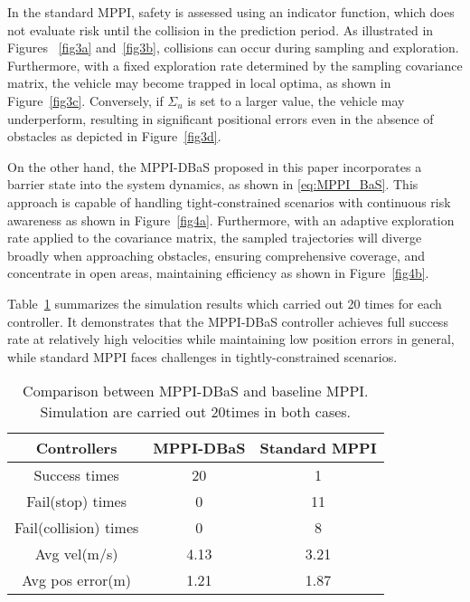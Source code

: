 \documentclass[english]{cccconf}
\begin{document}
In the standard MPPI, safety is assessed using an indicator function, which does not evaluate risk until the collision in the prediction period. As illustrated in Figures ~\ref{fig3a} and~\ref{fig3b}, collisions can occur during sampling and exploration. Furthermore, with a fixed exploration rate determined by the sampling covariance matrix, the vehicle may become trapped in local optima, as shown in Figure~\ref{fig3c}. Conversely, if $\Sigma_u$ is set to a larger value, the vehicle may underperform, resulting in significant positional errors even in the absence of obstacles as depicted in Figure~\ref{fig3d}.

On the other hand, the MPPI-DBaS proposed in this paper incorporates a barrier state into the system dynamics, as shown in \eqref{eq:MPPI_BaS}. This approach is capable of handling tight-constrained scenarios with continuous risk awareness as shown in Figure~\ref{fig4a}. Furthermore, with an adaptive exploration rate applied to the covariance matrix, the sampled trajectories will diverge broadly when approaching obstacles, ensuring comprehensive coverage, and concentrate in open areas, maintaining efficiency as shown in Figure~\ref{fig4b}.


Table~\ref{tab:table1} summarizes the simulation results which carried out 20 times for each controller. It demonstrates that the MPPI-DBaS controller achieves full success rate at relatively high velocities while maintaining low position errors in general, while standard MPPI faces challenges in tightly-constrained scenarios.


\begin{table}[!h]
    \caption{Comparison between MPPI-DBaS and baseline MPPI. Simulation are carried out 20times in both cases.}
    \begin{center}
        \begin{tabular}{ccc}
        \toprule[1pt]
        Controllers & MPPI-DBaS & Standard MPPI\\ \midrule
        Success times & 20 & 1 \\
        Fail(stop) times & 0 & 11 \\ 
        Fail(collision) times & 0 & 8 \\
        Avg vel(m/s) & 4.13 & 3.21 \\
        Avg pos error(m) & 1.21 & 1.87 \\
        \bottomrule[1pt]
        \end{tabular}   
    \end{center}
    \label{tab:table1}
\end{table}
\end{document}
